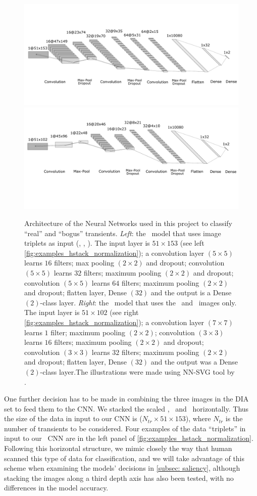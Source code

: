 \begin{figure}

   \centering
   \includegraphics[width=0.45\linewidth]{
    figures/aaa_big.pdf}
    \includegraphics[width=0.45\linewidth]{figures/ccc_bug.pdf}
   \caption{Architecture of the Neural Networks used in this project to classify ``real'' and ``bogus'' transients. {\it Left}: the \diabased\ model that uses image triplets as input (\diff, \temp, \search). The input layer is $51 \times 153$ (see left \autoref{fig:examples_hstack_normalization}); a convolution layer $(5\times 5)$ learns $16$ filters; max pooling $(2\times2)$ and dropout; convolution $(5\times 5)$ learns $32$ filters;  maximum pooling $(2\times2)$ and dropout; convolution $(5\times 5)$ learns $64$ filters;  maximum pooling $(2\times2)$ and dropout; flatten layer, Dense $(32)$ and the output is a Dense $(2)$-class layer. {\it Right}: the \nodia\ model that uses the \temp\ and \search\ images only. The input layer is $51 \times 102$ (see right \autoref{fig:examples_hstack_normalization}); a convolution layer $(7\times 7)$ learns $1$ filter; maximum pooling $(2\times2)$; convolution $(3\times 3)$ learns $16$ filters;  maximum pooling $(2\times2)$ and dropout; convolution $(3\times 3)$ learns $32$ filters;  maximum pooling $(2\times2)$ and dropout; flatten layer, Dense $(32)$ and the output was a Dense $(2)$-class layer.The illustrations were made using NN-SVG tool by \citet{LeNail2019}.}
\label{fig:architecturesCNN}
\end{figure}


One further decision has to be made in combining the three images in the DIA set to feed them to the CNN. We stacked the scaled \diff, \search\ and \temp\ horizontally. %
Thus the size of the data in input to our CNN is ($N_{tr}\times51\times153$), where $N_{tr}$ is the number of transients to be considered. Four examples of the data ``triplets'' in input to our \diabased\ CNN are in the left panel of \autoref{fig:examples_hstack_normalization}. Following this horizontal structure, we mimic closely the way that human scanned this type of data for classification, and we will take advantage of this scheme when examining the models' decisions in \autoref{subsec: saliency}, although stacking the images along a third depth axis has also been tested, with no differences in the model accuracy.

